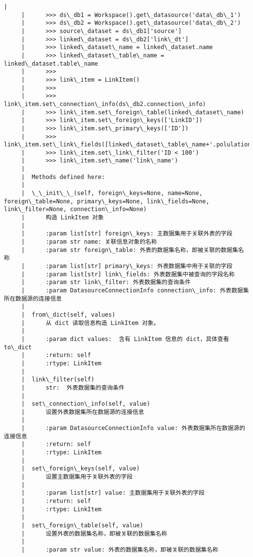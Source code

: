 \documentclass[11pt]{article}
\begin{document}
\begin{Verbatim}[commandchars=\\\{\}]
     |  
     |      >>> ds\_db1 = Workspace().get\_datasource('data\_db\_1')
     |      >>> ds\_db2 = Workspace().get\_datasource('data\_db\_2')
     |      >>> source\_dataset = ds\_db1['source']
     |      >>> linked\_dataset = ds\_db2['link\_dt']
     |      >>> linked\_dataset\_name = linked\_dataset.name
     |      >>> linked\_dataset\_table\_name = linked\_dataset.table\_name
     |      >>>
     |      >>> link\_item = LinkItem()
     |      >>>
     |      >>> link\_item.set\_connection\_info(ds\_db2.connection\_info)
     |      >>> link\_item.set\_foreign\_table(linked\_dataset\_name)
     |      >>> link\_item.set\_foreign\_keys(['LinkID'])
     |      >>> link\_item.set\_primary\_keys(['ID'])
     |      >>> link\_item.set\_link\_fields([linked\_dataset\_table\_name+'.polulation'])
     |      >>> link\_item.set\_link\_filter('ID < 100')
     |      >>> link\_item.set\_name('link\_name')
     |  
     |  Methods defined here:
     |  
     |  \_\_init\_\_(self, foreign\_keys=None, name=None, foreign\_table=None, primary\_keys=None, link\_fields=None, link\_filter=None, connection\_info=None)
     |      构造 LinkItem 对象
     |      
     |      :param list[str] foreign\_keys: 主数据集用于关联外表的字段
     |      :param str name: 关联信息对象的名称
     |      :param str foreign\_table: 外表的数据集名称，即被关联的数据集名称
     |      :param list[str] primary\_keys: 外表数据集中用于关联的字段
     |      :param list[str] link\_fields: 外表数据集中被查询的字段名称
     |      :param str link\_filter: 外表数据集的查询条件
     |      :param DatasourceConnectionInfo connection\_info: 外表数据集所在数据源的连接信息
     |  
     |  from\_dict(self, values)
     |      从 dict 读取信息构造 LinkItem 对象。
     |      
     |      :param dict values:  含有 LinkItem 信息的 dict，具体查看 to\_dict
     |      :return: self
     |      :rtype: LinkItem
     |  
     |  link\_filter(self)
     |      str:  外表数据集的查询条件
     |  
     |  set\_connection\_info(self, value)
     |      设置外表数据集所在数据源的连接信息
     |      
     |      :param DatasourceConnectionInfo value: 外表数据集所在数据源的连接信息
     |      :return: self
     |      :rtype: LinkItem
     |  
     |  set\_foreign\_keys(self, value)
     |      设置主数据集用于关联外表的字段
     |      
     |      :param list[str] value: 主数据集用于关联外表的字段
     |      :return: self
     |      :rtype: LinkItem
     |  
     |  set\_foreign\_table(self, value)
     |      设置外表的数据集名称，即被关联的数据集名称
     |      
     |      :param str value: 外表的数据集名称，即被关联的数据集名称

\end{Verbatim}
\end{document}
